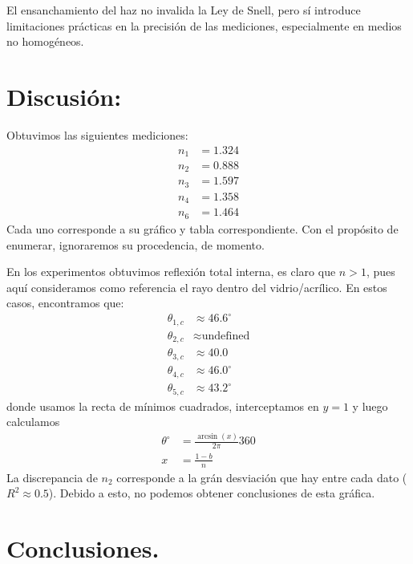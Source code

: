 \documentclass[11pt,twocolumn]{article}
\begin{document}
El ensanchamiento del haz no invalida la Ley de Snell, pero sí introduce limitaciones prácticas en la precisión de las mediciones, especialmente en medios no homogéneos.


\section{Discusión:}

Obtuvimos las siguientes mediciones:
\begin{align*}
    n_1 &=1.324\\
    n_2 &= 0.888 \\ 
    n_3 &= 1.597 \\ 
    n_4 &= 1.358 \\
    n_6 &= 1.464
\end{align*}
Cada uno corresponde a su gráfico y tabla correspondiente. Con el propósito de enumerar, ignoraremos su procedencia, de momento.

En los experimentos obtuvimos reflexión total interna, es claro que $n>1$, pues aquí consideramos como referencia el rayo dentro del vidrio/acrílico. En estos casos, encontramos que:
\begin{align*}
    \theta_{1,c}&\approx 46.6^{\circ}\\
    \theta_{2,c}&\approx \text{undefined}\\
    \theta_{3,c}&\approx 40.0\\
    \theta_{4,c}&\approx46.0^{\circ}\\
    \theta_{5,c}&\approx 43.2^{\circ}
\end{align*}
donde usamos la recta de mínimos cuadrados, interceptamos en $y=1$ y luego calculamos
\begin{align*}
    \theta^{\circ}&=\frac{\arcsin(x)}{2\pi}360\\
    x&=\frac{1-b}{n}
\end{align*}
La discrepancia de $n_2$ corresponde a la grán desviación que hay entre cada dato ($R^2\approx 0.5$). Debido a esto, no podemos obtener conclusiones de esta gráfica.
\section{Conclusiones.}

\end{document}
